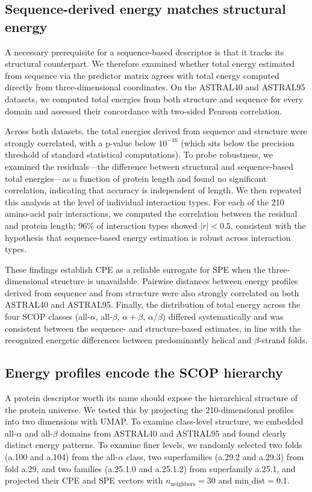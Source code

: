 \documentclass[11pt]{article}
\begin{document}
\subsection{Sequence-derived energy matches structural energy}

A necessary prerequisite for a sequence-based descriptor is that it tracks
its structural counterpart. We therefore examined whether total energy
estimated from sequence via the predictor matrix agrees with total energy
computed directly from three-dimensional coordinates. On the ASTRAL40 and
ASTRAL95 datasets, we computed total energies from both structure and
sequence for every domain and assessed their concordance with two-sided
Pearson correlation.

Across both datasets, the total energies derived from sequence and structure
were strongly correlated, with a p-value below $10^{-16}$ (which sits below
the precision threshold of standard statistical computations). To probe
robustness, we examined the residuals---the difference between structural and
sequence-based total energies---as a function of protein length and found no
significant correlation, indicating that accuracy is independent of length.
We then repeated this analysis at the level of individual interaction types.
For each of the 210 amino-acid pair interactions, we computed the correlation
between the residual and protein length; 96\% of interaction types showed
$|r|<0.5$, consistent with the hypothesis that sequence-based energy
estimation is robust across interaction types.

These findings establish CPE as a reliable surrogate for SPE when the
three-dimensional structure is unavailable. Pairwise distances between
energy profiles derived from sequence and from structure were also strongly
correlated on both ASTRAL40 and ASTRAL95. Finally, the distribution of total
energy across the four SCOP classes (all-$\alpha$, all-$\beta$,
$\alpha+\beta$, $\alpha/\beta$) differed systematically and was consistent
between the sequence- and structure-based estimates, in line with the
recognized energetic differences between predominantly helical and
$\beta$-strand folds.

\subsection{Energy profiles encode the SCOP hierarchy}

A protein descriptor worth its name should expose the hierarchical structure
of the protein universe. We tested this by projecting the 210-dimensional
profiles into two dimensions with UMAP. To examine class-level structure, we
embedded all-$\alpha$ and all-$\beta$ domains from ASTRAL40 and ASTRAL95 and
found clearly distinct energy patterns. To examine finer levels, we
randomly selected two folds (a.100 and a.104) from the all-$\alpha$ class,
two superfamilies (a.29.2 and a.29.3) from fold a.29, and two families
(a.25.1.0 and a.25.1.2) from superfamily a.25.1, and projected their CPE and
SPE vectors with $n_\text{neighbors}=30$ and $\text{min\_dist}=0.1$.
\end{document}
